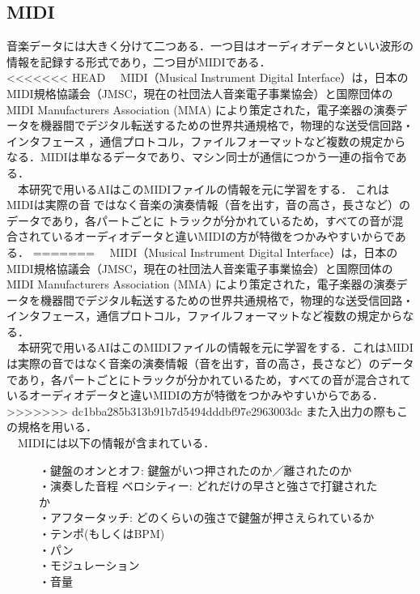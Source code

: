 \subsection{MIDI}
音楽データには大きく分けて二つある．一つ目はオーディオデータといい波形の情報を記録する形式であり，二つ目がMIDIである．\\
<<<<<<< HEAD
　MIDI（Musical Instrument Digital Interface）は，日本のMIDI規格協議会（JMSC，現在の社団法人音楽電子事業協会）と国際団体のMIDI Manufacturers Association (MMA) により策定された，電子楽器の演奏データを機器間でデジタル転送するための世界共通規格で，物理的な送受信回路・インタフェース，通信プロトコル，ファイルフォーマットなど複数の規定からなる．MIDIは単なるデータであり、マシン同士が通信につかう一連の指令である．\\
　本研究で用いるAIはこのMIDIファイルの情報を元に学習をする．これはMIDIは実際の音ではなく音楽の演奏情報（音を出す，音の高さ，長さなど）のデータであり，各パートごとにトラックが分かれているため，すべての音が混合されているオーディオデータと違いMIDIの方が特徴をつかみやすいからである．
=======
　MIDI（Musical Instrument Digital Interface）は，日本のMIDI規格協議会（JMSC，現在の社団法人音楽電子事業協会）と国際団体のMIDI Manufacturers Association (MMA) により策定された，電子楽器の演奏データを機器間でデジタル転送するための世界共通規格で，物理的な送受信回路・インタフェース，通信プロトコル，ファイルフォーマットなど複数の規定からなる．\\
　本研究で用いるAIはこのMIDIファイルの情報を元に学習をする．これはMIDIは実際の音ではなく音楽の演奏情報（音を出す，音の高さ，長さなど）のデータであり，各パートごとにトラックが分かれているため，すべての音が混合されているオーディオデータと違いMIDIの方が特徴をつかみやすいからである．
>>>>>>> dc1bba285b313b91b7d5494dddbf97e2963003dc
また入出力の際もこの規格を用いる．\\
　MIDIには以下の情報が含まれている．
\begin{figure}[!ht]
    \begin{screen}
・鍵盤のオンとオフ: 鍵盤がいつ押されたのか／離されたのか\\
・演奏した音程 ベロシティー: どれだけの早さと強さで打鍵されたか\\
・アフタータッチ: どのくらいの強さで鍵盤が押さえられているか\\
・テンポ(もしくはBPM)\\
・パン\\
・モジュレーション\\
・音量\\
    \end{screen}
\end{figure}\\
